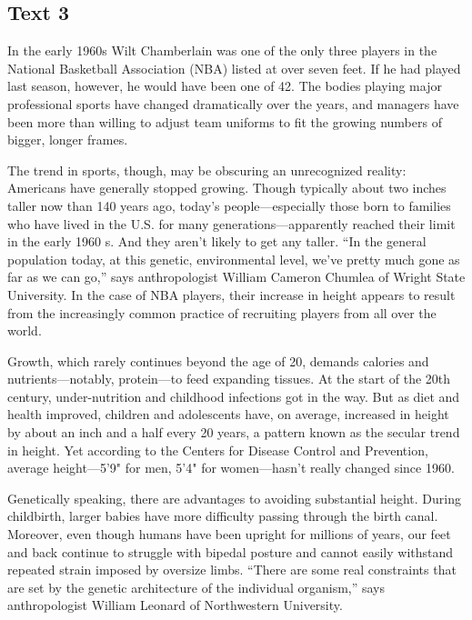 \newpage
\subsection{Text 3}


In the early 1960s Wilt Chamberlain was one of the only three players in
the National Basketball Association (NBA) listed at over seven feet. If
he had played last season, however, he would have been one of 42. The
bodies playing major professional sports have changed dramatically over
the years, and managers have been more than willing to adjust team
uniforms to fit the growing numbers of bigger, longer frames.

The trend in sports, though, may be obscuring an unrecognized reality:
Americans have generally stopped growing. Though typically about two
inches taller now than 140 years ago, today's people---especially those
born to families who have lived in the U.S. for many
generations---apparently reached their limit in the early 1960 s. And they
aren't likely to get any taller. ``In the general population today, at
this genetic, environmental level, we've pretty much gone as far as we
can go,'' says anthropologist William Cameron Chumlea of Wright State
University. In the case of NBA players, their increase in height appears
to result from the increasingly common practice of recruiting players
from all over the world.

Growth, which rarely continues beyond the age of 20, demands calories
and nutrients---notably, protein---to feed expanding tissues. At the
start of the 20th century, under-nutrition and childhood infections got
in the way. But as diet and health improved, children and adolescents
have, on average, increased in height by about an inch and a half every
20 years, a pattern known as the secular trend in height. Yet according
to the Centers for Disease Control and Prevention, average height---5'9"
for men, 5'4" for women---hasn't really changed since 1960.

Genetically speaking, there are advantages to avoiding substantial
height. During childbirth, larger babies have more difficulty passing
through the birth canal. Moreover, even though humans have been upright
for millions of years, our feet and back continue to struggle with
bipedal posture and cannot easily withstand repeated strain imposed by
oversize limbs. ``There are some real constraints that are set by the
genetic architecture of the individual organism,'' says anthropologist
William Leonard of Northwestern University.

